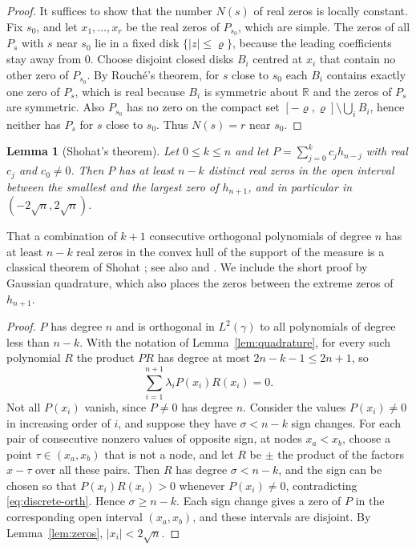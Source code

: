\documentclass[11pt]{amsart}
\newtheorem{lemma}[theorem]{Lemma}
\theoremstyle{definition}
\theoremstyle{remark}
\numberwithin{equation}{section}
\newcommand{\R}{\mathbb{R}}
\begin{document}
\begin{proof}
It suffices to show that the number $N(s)$ of real zeros is locally constant. Fix $s_0$, and let $x_1,\dots,x_r$ be the real zeros of $P_{s_0}$, which are simple. The zeros of all $P_s$ with $s$ near $s_0$ lie in a fixed disk $\{|z|\le\varrho\}$, because the leading coefficients stay away from $0$. Choose disjoint closed disks $B_i$ centred at $x_i$ that contain no other zero of $P_{s_0}$. By Rouch\'e's theorem, for $s$ close to $s_0$ each $B_i$ contains exactly one zero of $P_s$, which is real because $B_i$ is symmetric about $\R$ and the zeros of $P_s$ are symmetric. Also $P_{s_0}$ has no zero on the compact set $[-\varrho,\varrho]\setminus\bigcup_i B_i$, hence neither has $P_s$ for $s$ close to $s_0$. Thus $N(s)=r$ near $s_0$.
\end{proof}

\begin{lemma}[Shohat's theorem]\label{lem:quasi}
Let $0\le k\le n$ and let $P=\sum_{j=0}^{k}c_jh_{n-j}$ with real $c_j$ and $c_0\ne0$. Then $P$ has at least $n-k$ distinct real zeros in the open interval between the smallest and the largest zero of $h_{n+1}$, and in particular in $(-2\sqrt n,2\sqrt n)$.
\end{lemma}

That a combination of $k+1$ consecutive orthogonal polynomials of degree $n$ has at least $n-k$ real zeros in the convex hull of the support of the measure is a classical theorem of Shohat \cite{Sh}; see also \cite{BD} and \cite[Lemma~3.1]{Du2}. We include the short proof by Gaussian quadrature, which also places the zeros between the extreme zeros of $h_{n+1}$.

\begin{proof}
$P$ has degree $n$ and is orthogonal in $L^2(\gamma)$ to all polynomials of degree less than $n-k$. With the notation of Lemma~\ref{lem:quadrature}, for every such polynomial $R$ the product $PR$ has degree at most $2n-k-1\le2n+1$, so
\begin{equation}\label{eq:discrete-orth}
\sum_{i=1}^{n+1}\lambda_iP(x_i)R(x_i)=0 .
\end{equation}
Not all $P(x_i)$ vanish, since $P\ne0$ has degree $n$. Consider the values $P(x_i)\ne0$ in increasing order of $i$, and suppose they have $\sigma<n-k$ sign changes. For each pair of consecutive nonzero values of opposite sign, at nodes $x_a<x_b$, choose a point $\tau\in(x_a,x_b)$ that is not a node, and let $R$ be $\pm$ the product of the factors $x-\tau$ over all these pairs. Then $R$ has degree $\sigma<n-k$, and the sign can be chosen so that $P(x_i)R(x_i)>0$ whenever $P(x_i)\ne0$, contradicting \eqref{eq:discrete-orth}. Hence $\sigma\ge n-k$. Each sign change gives a zero of $P$ in the corresponding open interval $(x_a,x_b)$, and these intervals are disjoint. By Lemma~\ref{lem:zeros}, $|x_i|<2\sqrt n$.
\end{proof}
\end{document}
